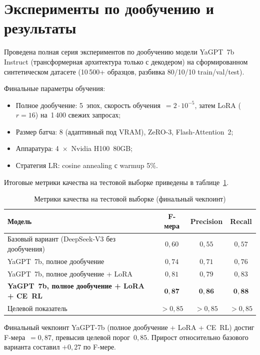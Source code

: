 \documentclass[times]{itmo-student-thesis}
\begin{document}
\section{Эксперименты по дообучению и результаты}

Проведена полная серия экспериментов по дообучению модели YaGPT~7b Instruct
(трансформерная архитектура только с декодером) на сформированном синтетическом датасете
(10\,500+ образцов, разбивка 80/10/10 train/val/test).

Финальные параметры обучения:
\begin{itemize}
    \item Полное дообучение: 5~эпох, скорость обучения~$= 2 \cdot 10^{-5}$,
          затем LoRA ($r=16$) на~1\,400 свежих запросах;
    \item Размер батча: 8 (адаптивный под VRAM), ZeRO-3, Flash-Attention~2;
    \item Аппаратура: 4~$\times$~Nvidia H100~80GB;
    \item Стратегия LR: cosine annealing с warmup 5\%.
\end{itemize}

Итоговые метрики качества на тестовой выборке приведены
в таблице~\ref{tab:results}.

\begin{table}[H]
\caption{Метрики качества на тестовой выборке (финальный чекпоинт)}\label{tab:results}
\centering
\begin{tabular}{|l|c|c|c|}
\hline
\textbf{Модель} & \textbf{F-мера} & \textbf{Precision} & \textbf{Recall} \\
\hline
Базовый вариант (DeepSeek-V3 без дообучения) & $0{,}60$ & $0{,}55$ & $0{,}57$ \\
\hline
YaGPT~7b, полное дообучение & $0{,}74$ & $0{,}71$ & $0{,}76$ \\
\hline
YaGPT~7b, полное дообучение + LoRA & $0{,}81$ & $0{,}79$ & $0{,}83$ \\
\hline
\textbf{YaGPT~7b, полное дообучение + LoRA + CE~RL} & $\mathbf{0{,}87}$ & $\mathbf{0{,}86}$ & $\mathbf{0{,}88}$ \\
\hline
Целевой показатель & $>0{,}85$ & $>0{,}85$ & $>0{,}85$ \\
\hline
\end{tabular}
\end{table}

Финальный чекпоинт YaGPT-7b (полное дообучение + LoRA + CE~RL) достиг
F-мера~$= 0{,}87$, превысив целевой порог~$0{,}85$. Прирост
относительно базового варианта составил $+0{,}27$ по F-мере.
\end{document}
